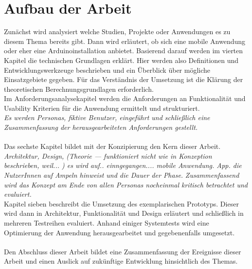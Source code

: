 \section{Aufbau der Arbeit}
Zunächst wird analysiert welche Studien, Projekte oder Anwendungen es zu diesem Thema bereits gibt. Dann wird erläutert, ob sich eine mobile Anwendung oder eher eine \gls{Arduino}installation anbietet. Basierend darauf werden im vierten Kapitel die technischen Grundlagen erklärt. Hier werden also Definitionen und Entwicklungswerkzeuge beschrieben und ein Überblick über mögliche Einsatzgebiete gegeben. Für das Verständnis der Umsetzung ist die Klärung der theoretischen Berechnungsgrundlagen erforderlich. \\
Im Anforderungsanalysekapitel werden die Anforderungen an Funktionalität und Usability Kriterien für die Anwendung ermittelt und strukturiert. \\
\textit{Es werden Personas, fiktive Benutzer, eingeführt und schließlich eine Zusammenfassung der herausgearbeiteten Anforderungen gestellt.}\\\\ 
Das sechste Kapitel bildet mit der Konzipierung den Kern dieser Arbeit. 
\textit{Architektur, Design, (Theorie --- funktioniert nicht wie in Konzeption beschrieben, weil... )
es wird auf.. einngegangen.... mobile Anwendung. \gls{App}. die NutzerInnen auf Ampeln hinweist und die Dauer der Phase. }
\textit{Zusammenfassend wird das Konzept am Ende von allen Personas nocheinmal kritisch betrachtet und evaluiert.}\\
Kapitel sieben beschreibt die Umsetzung des exemplarischen Prototyps. Dieser wird dann in Architektur, Funktionalität und Design erläutert und schließlich in mehreren Testreihen evaluiert. Anhand einiger Systemtests wird eine Optimierung der Anwendung herausgearbeitet und gegebenenfalls umgesetzt. 
\\\\Den Abschluss dieser Arbeit bildet eine Zusammenfassung der Ereignisse dieser Arbeit und einen Auslick auf zukünftige Entwicklung hinsichtlich des Themas.
